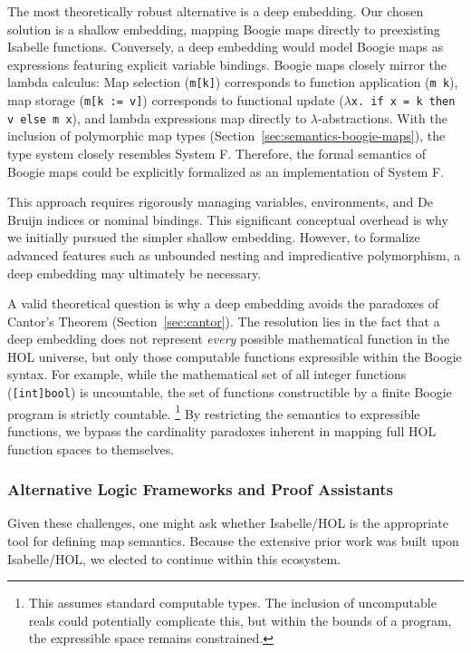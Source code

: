 \documentclass[11pt]{article}
\begin{document}
The most theoretically robust alternative is a deep embedding.
Our chosen solution is a shallow embedding, mapping Boogie maps directly to preexisting Isabelle functions.
Conversely, a deep embedding would model Boogie maps as expressions featuring explicit variable bindings.
Boogie maps closely mirror the lambda calculus:
Map selection (\texttt{m[k]}) corresponds to function application (\texttt{m k}),
map storage (\texttt{m[k := v]}) corresponds to functional update (\texttt{$\lambda$x. if x = k then v else m x}),
and lambda expressions map directly to $\lambda$-abstractions.
With the inclusion of polymorphic map types (Section~\ref{sec:semantics-boogie-maps}), the type system closely resembles System F. %
Therefore, the formal semantics of Boogie maps could be explicitly formalized as an implementation of System F.

This approach requires rigorously managing variables, environments, and De Bruijn indices or nominal bindings.
This significant conceptual overhead is why we initially pursued the simpler shallow embedding.
However, to formalize advanced features such as unbounded nesting and impredicative polymorphism, a deep embedding may ultimately be necessary.

A valid theoretical question is why a deep embedding avoids the paradoxes of Cantor's Theorem (Section~\ref{sec:cantor}).
The resolution lies in the fact that a deep embedding does not represent \emph{every} possible mathematical function in the HOL universe,
but only those computable functions expressible within the Boogie syntax.
For example, while the mathematical set of all integer functions (\texttt{[int]bool}) is uncountable,
the set of functions constructible by a finite Boogie program is strictly countable.
\footnote{This assumes standard computable types. The inclusion of uncomputable reals could potentially complicate this, but within the bounds of a program, the expressible space remains constrained.}
By restricting the semantics to expressible functions, we bypass the cardinality paradoxes inherent in mapping full HOL function spaces to themselves.

\subsubsection{Alternative Logic Frameworks and Proof Assistants}

Given these challenges, one might ask whether Isabelle/HOL is the appropriate tool for defining map semantics.
Because the extensive prior work was built upon Isabelle/HOL, we elected to continue within this ecosystem.
\end{document}
